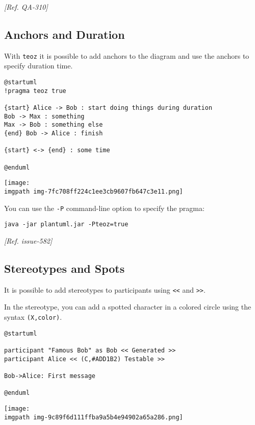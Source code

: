 \textit{[Ref. QA-310]}
%
%
\subsection{Anchors and Duration}






With \texttt{teoz} it is possible to add anchors to the diagram and use the anchors to specify duration time.
\begin{verbatim}
@startuml
!pragma teoz true

{start} Alice -> Bob : start doing things during duration
Bob -> Max : something
Max -> Bob : something else
{end} Bob -> Alice : finish

{start} <-> {end} : some time

@enduml
\end{verbatim}
\begin{center}
\texttt{[image: \\imgpath img-7fc708ff224c1ee3cb9607fb647c3e11.png]}
\end{center}


You can use the \texttt{-P} command-line option to specify the pragma:
\begin{verbatim}
java -jar plantuml.jar -Pteoz=true
\end{verbatim}
\textit{[Ref. issue-582]}
%
%
\subsection{Stereotypes and Spots}






It is possible to add stereotypes to participants using \texttt{<<}
and \texttt{>>}.


In the stereotype, you can add a spotted character
in a colored circle using the syntax \texttt{(X,color)}.
\begin{verbatim}
@startuml

participant "Famous Bob" as Bob << Generated >>
participant Alice << (C,#ADD1B2) Testable >>

Bob->Alice: First message

@enduml
\end{verbatim}
\begin{center}
\texttt{[image: \\imgpath img-9c89f6d111ffba9a5b4e94902a65a286.png]}
\end{center}


